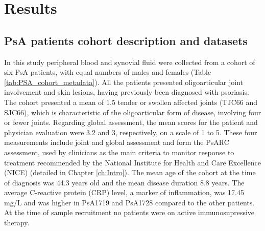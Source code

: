 \section{Results}
%

\subsection{PsA patients cohort description and datasets}
In this study peripheral blood and synovial fluid were collected from a cohort of six PsA patients, with equal numbers of males and females (Table \ref{tab:PSA_cohort_metadata}). All the patients presented oligoarticular joint involvement and skin lesions, having previously been diagnosed with psoriasis. The cohort presented a mean of 1.5 tender or swollen affected joints (TJC66 and SJC66), which is characteristic of the oligoarticular form of disease, involving four or fewer joints. Regarding global assessment, the mean scores for the patient and physician evaluation were 3.2 and 3, respectively, on a scale of 1 to 5. These four measurements include joint and global assessment and form the PsARC assessment, used by clinicians as the main criteria to monitor response to treatment recommended by the National Institute for Health and Care Excellence (NICE) (detailed in Chapter \ref{ch:Intro}). The mean age of the cohort at the time of diagnosis was 44.3 years old and the mean disease duration 8.8 years. The average C-reactive protein (CRP) level, a marker of inflammation, was 17.45 mg/L and was higher in PsA1719 and PsA1728 compared to the other patients. At the time of sample recruitment no patients were on active immunosupressive therapy.


